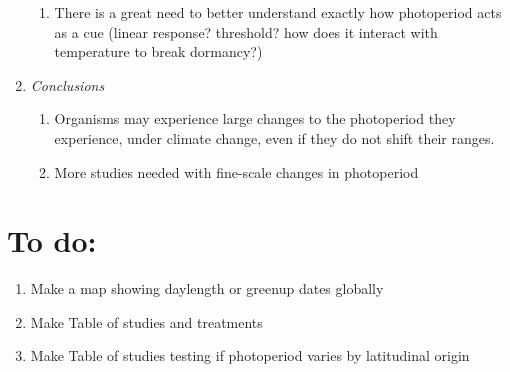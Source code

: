 \documentclass{article}
\begin{document}
\begin{enumerate}
\begin{enumerate}
\item There is a great need to better understand exactly how photoperiod acts as a cue (linear response? threshold? how does it interact with temperature to break dormancy?)
\end{enumerate}
\item\textit{Conclusions}
\begin{enumerate}
\item Organisms may experience large changes to the photoperiod they experience, under climate change, even if they do not shift their ranges.
\item More studies needed with fine-scale changes in photoperiod
\end{enumerate}
\end{enumerate}

\section* {To do:}
\begin{enumerate}
\item Make a map showing daylength or greenup dates globally 
\item Make Table of studies and treatments
\item Make Table of studies testing if photoperiod varies by latitudinal origin
\end{enumerate}

\clearpage
\end{document}
